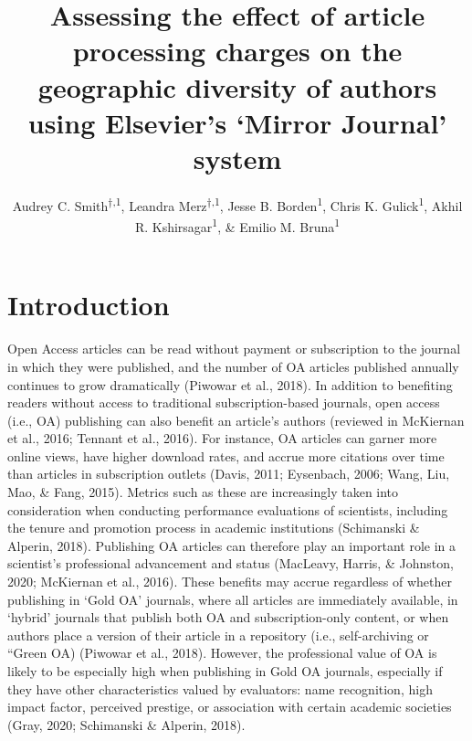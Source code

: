 \documentclass[
  english,
  man]{apa6}
\title{Assessing the effect of article processing charges on the geographic diversity of authors using Elsevier's `Mirror Journal' system}
\author{Audrey C. Smith\textsuperscript{$\dagger{}$,1}, Leandra Merz\textsuperscript{$\dagger{}$,1}, Jesse B. Borden\textsuperscript{1}, Chris K. Gulick\textsuperscript{1}, Akhil R. Kshirsagar\textsuperscript{1}, \& Emilio M. Bruna\textsuperscript{1}}
\date{}
\affiliation{\vspace{0.5cm}\textsuperscript{1} University of Florida}
\begin{document}
\maketitle

\hypertarget{introduction}{%
\section{Introduction}\label{introduction}}

Open Access articles can be read without payment or subscription to the journal in which they were published, and the number of OA articles published annually continues to grow dramatically (Piwowar et al., 2018). In addition to benefiting readers without access to traditional subscription-based journals, open access (i.e., OA) publishing can also benefit an article's authors (reviewed in McKiernan et al., 2016; Tennant et al., 2016). For instance, OA articles can garner more online views, have higher download rates, and accrue more citations over time than articles in subscription outlets (Davis, 2011; Eysenbach, 2006; Wang, Liu, Mao, \& Fang, 2015). Metrics such as these are increasingly taken into consideration when conducting performance evaluations of scientists, including the tenure and promotion process in academic institutions (Schimanski \& Alperin, 2018). Publishing OA articles can therefore play an important role in a scientist's professional advancement and status (MacLeavy, Harris, \& Johnston, 2020; McKiernan et al., 2016). These benefits may accrue regardless of whether publishing in `Gold OA' journals, where all articles are immediately available, in `hybrid' journals that publish both OA and subscription-only content, or when authors place a version of their article in a repository (i.e., self-archiving or ``Green OA) (Piwowar et al., 2018). However, the professional value of OA is likely to be especially high when publishing in Gold OA journals, especially if they have other characteristics valued by evaluators: name recognition, high impact factor, perceived prestige, or association with certain academic societies (Gray, 2020; Schimanski \& Alperin, 2018).\\
\end{document}
